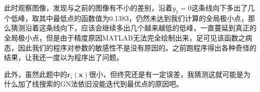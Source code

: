 此时观察图像，发现与之前的图像有不小的差别，沿着$y_1=0$这条线向下多出了几个低峰，取其中最低点的函数值为0.1383，仍然未达到我们计算的全局极小点，那么猜测沿着这条线向下，应该会继续多出几个越来越低的低峰，一直蔓延到真正的全局极小点，但是由于精度原因MATLAB无法完全绘制出来，足可见该函数之病态，因此我们的程序对参数的敏感性不是没有原因的。之前跑程序得出各种奇怪的结果，让我还一度以为程序出了问题。

此外，虽然此题中的$\bm{r}_i(\bm{x})$很小，但终究还是有一定误差，我猜测这就可能是为什么加了线搜索的GN法依旧没能迭代到最优点的原因吧。



